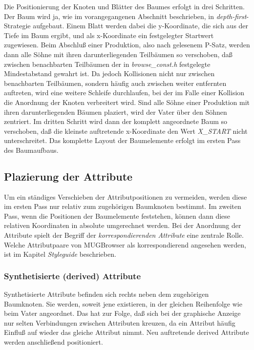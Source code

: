 Die Positionierung der Knoten und Bl\"atter des Baumes erfolgt in drei Schritten. Der Baum wird ja, wie im vorangegangenen Abschnitt beschrieben, in
{\it depth-first}-Strategie aufgebaut. Einem Blatt werden dabei die y-Koordinate, die sich aus der Tiefe im Baum ergibt, und als x-Koordinate ein
festgelegter Startwert zugewiesen. Beim Abschlu\ss{} einer Produktion, also nach gelesenem P-Satz, werden dann alle S\"ohne mit ihren darunterliegenden
Teilb\"aumen so verschoben, da\ss{} zwischen benachbarten Teilb\"aumen der in {\it browse\_const.h} festgelegte Mindestabstand gewahrt ist. Da jedoch
Kollisionen nicht nur zwischen benachbarten Teilb\"aumen, sondern h\"aufig auch zwischen weiter entfernten auftreten, wird eine weitere Schleife
durchlaufen, bei der im Falle einer Kollision die Anordnung der Knoten verbreitert wird. Sind alle S\"ohne einer
Produktion mit ihren darunterliegenden B\"aumen plaziert, wird der Vater \"uber den S\"ohnen zentriert. Im dritten Schritt wird dann der komplett
angeordnete Baum so verschoben, da\ss{} die kleinste auftretende x-Koordinate den Wert {\it X\_START} nicht unterschreitet. Das komplette Layout der
Baumelemente erfolgt im ersten Pass des Baumaufbaus.

\subsection{Plazierung der Attribute}

Um ein st\"andiges Verschieben der Attributpositionen zu vermeiden, werden diese im ersten Pass nur relativ zum zugeh\"origen Baumknoten bestimmt. Im
zweiten Pass, wenn die Positionen der Baumelemente feststehen, k\"onnen dann diese relativen Koordinaten in absolute umgerechnet werden.
Bei der Anordnung der Attribute spielt der Begriff der {\it korrespondierenden Attribute} eine zentrale Rolle. Welche Attributpaare von MUGBrowser
als korrespondierend angesehen werden, ist im Kapitel {\it Styleguide} beschrieben.

\subsubsection{Synthetisierte (derived) Attribute}

Synthetisierte Attribute befinden sich rechts neben dem zugeh\"origen Baumknoten. Sie werden, soweit jene existieren, in der gleichen Reihenfolge wie
beim Vater angeordnet. Das hat zur Folge, da\ss{} sich bei der graphische Anzeige nur selten Verbindungen zwischen Attributen kreuzen, da ein Attribut h\"aufig Einflu\ss{} auf wieder das gleiche Attribut nimmt. Neu auftretende
derived Attribute werden anschlie\ss{}end positioniert.


